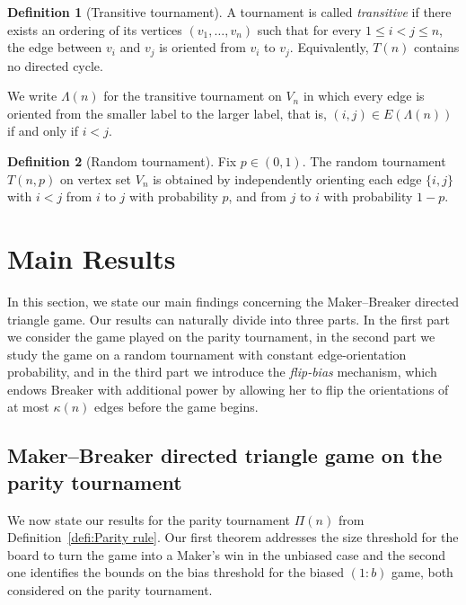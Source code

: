 \documentclass{article}
\theoremstyle{definition}
\newtheorem{defi}{Definition}[section]
\theoremstyle{plain}
\theoremstyle{remark}
\theoremstyle{definition}
\begin{document}
\begin{defi}[Transitive tournament]\label{defi:transitive tournament}
A tournament is called \emph{transitive} if there exists an ordering of its vertices
$(v_1,\ldots,v_n)$ such that for every $1\le i<j\le n$, the edge between $v_i$ and $v_j$
is oriented from $v_i$ to $v_j$.
Equivalently, $T(n)$ contains no directed cycle.

We write $\Lambda(n)$ for the transitive tournament on $V_n$ in which every edge is oriented
from the smaller label to the larger label, that is, $(i,j)\in E(\Lambda(n))$ if and only if $i<j$.
\end{defi}


\begin{defi}[Random tournament]\label{defi:randomtournament}
Fix $p\in(0,1)$. The random tournament $T(n,p)$ on vertex set $V_n$ is obtained by independently orienting each edge
$\{i,j\}$ with $i<j$ from $i$ to $j$ with probability $p$, and from $j$ to $i$ with probability $1-p$.
\end{defi}

\section{Main Results} \label{section:Main_Results}

In this section, we state our main findings concerning the Maker–Breaker directed triangle game. Our results can naturally divide into three parts. In the first part we consider the game played on the parity tournament, in the second part we study the game on a random tournament with constant edge-orientation probability, and in the third part we introduce the \emph{flip-bias} mechanism, which endows Breaker with additional power by allowing her to flip the orientations of at most $\kappa(n)$ edges before the game begins.

\subsection{Maker–Breaker directed triangle game on the parity tournament}\label{subsec:paritytournament}

We now state our results for the parity tournament $\Pi(n)$ from Definition~\ref{defi:Parity rule}.
Our first theorem addresses the size threshold for the board to turn the game into a Maker's win in the unbiased case and the second one identifies the bounds on the bias threshold for the biased $(1:b)$ game, both considered on the parity tournament.
\end{document}
